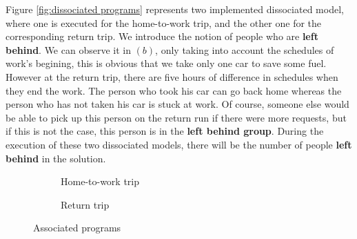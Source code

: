 \documentclass[12pt, a4paper,twoside]{memoir}
\begin{document}
	Figure \ref{fig:dissociated programs} represents two implemented dissociated model, where one is executed for the home-to-work trip, and the other one for the corresponding return trip. \newline
	We introduce the notion of people who are \textbf{left behind}. We can observe it in $(b)$, only taking into account the schedules of work's begining, this is obvious that we take only one car to save some fuel. However at the return trip, there are five hours of difference in schedules when they end the work. The person who took his car can go back home whereas the person who has not taken his car is stuck at work. \newline
	Of course, someone else would be able to pick up this person on the return run if there were more requests, but if this is not the case, this person is in the \textbf{left behind group}.\newline
	During the execution of these two dissociated models, there will be the number of people \textbf{left behind} in the solution.
	
	\begin{figure}[H]
		\centering
		\begin{subfigure}{.5\textwidth}
			\centering
			\caption{Home-to-work trip}
		\end{subfigure}%
		\begin{subfigure}{.5\textwidth}
			\centering
			\caption{Return trip}
		\end{subfigure}
		\caption{Associated programs}
		\label{fig:associated programs}
	\end{figure}
	
\end{document}
